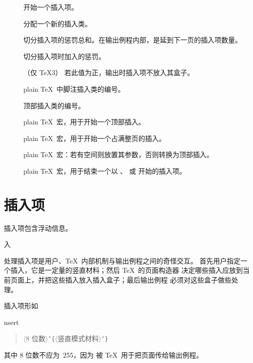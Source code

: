 \documentclass[a4paper]{rapport3}
\makeatletter
\def\lb{{\tt\char`\{}}\def\rb{{\tt\char`\}}}
\def\gr#1{$\langle$#1$\rangle$}\def\key#1{{\tt#1}}
\newenvironment{disp}{\begin{quotation}}{\end{quotation}}
\newenvironment{inventory}{\begin{description}}{\end{description}}
\def\term#1\par{\index{#1}}
\def\cstoidx#1\par{\index{#1@\cs{#1}}}
\makeatother
\begin{document}
\begin{inventory}
\item [] 
      开始一个插入项。

\item [] 
      分配一个新的插入类。

\item [] 
      切分插入项的惩罚总和。在输出例程内部，是延到下一页的插入项数量。

\item [] 
      切分插入项时加入的惩罚。

\item []
      （仅 \TeX3）
      若此值为正，输出时插入项不放入其盒子。

\item []
      plain \TeX\ 中脚注插入类的编号。

\item []
      顶部插入类的编号。

\item []
      plain \TeX\ 宏，用于开始一个顶部插入。

\item []
      plain \TeX\ 宏，用于开始一个占满整页的插入。

\item []
      plain \TeX\ 宏：若有空间则放置其参数，否则转换为顶部插入。

\item []
      plain \TeX\ 宏，用于结束一个以 、
      或  开始的插入项。

\end{inventory}


\section{插入项}

插入项包含浮动信息。
\term 插入\par
处理插入项是用户、\TeX\ 内部机制与输出例程之间的奇怪交互。
首先用户指定一个插入，它是一定量的竖直材料；然后 \TeX\ 的页面构造器
决定哪些插入应放到当前页面上，并把这些插入放入插入盒子；最后输出例程
必须对这些盒子做些处理。

插入项形如
\cstoidx insert\par
\begin{disp}\gr{8 位数}\lb\gr{竖直模式材料}\rb
\end{disp} 其中 8 位数不应为~255，因为  被 \TeX\ 用于把页面传给输出例程。
\end{document}
